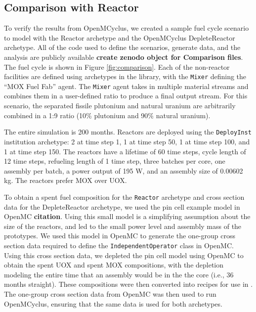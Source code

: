 \subsection{Comparison with \Cycamore Reactor}
To verify the results from OpenMCyclus, we created a sample fuel cycle 
scenario to model with the \Cycamore Reactor archetype and the 
OpenMCyclus DepleteReactor archetype. All of the code used to define the 
scenarios, generate data, and the analysis are publicly available 
\textbf{create zenodo object for Comparison files}. The fuel cycle is 
shown in Figure 
\ref{fig:comparison}. Each of the non-reactor facilities are defined 
using archetypes in the \Cycamore library, with the \Cycamore \texttt{Mixer}
defining the ``MOX Fuel Fab'' agent. The \texttt{Mixer} agent takes in multiple 
material streams and combines them in a user-defined ratio to produce 
a final output stream. For this scenario, the separated fissile plutonium 
and natural uranium are arbitrarily combined in a 1:9 ratio (10\% 
plutonium and 90\% natural uranium). 



The entire simulation is 200 months. Reactors are deployed using the 
\Cycamore \texttt{DeployInst} institution archetype: 2 at time step 1, 
1 at time step 
50, 1 at time step 100, and 1 at time step 150. The reactors have a lifetime 
of 60 time steps, cycle length of 12 time steps, refueling length of 1 
time step, three batches per core, one assembly per batch, a power output of 
195 W, and an assembly size of 0.00602 kg. The reactors prefer MOX over UOX. 
 
To obtain a spent fuel composition for the \Cycamore \texttt{Reactor} 
archetype and cross section data for the DepleteReactor archetype, we 
used the pin cell example model in OpenMC \textbf{citation}. 
Using this 
small model is a simplifying assumption about the size of the reactors, 
and led to the small power level and assembly mass of the prototypes. 
We used this model in OpenMC to generate the one-group cross 
section data required to define the \texttt{IndependentOperator} class 
in OpenMC. Using this cross section data, we depleted the pin cell 
model using OpenMC to obtain the spent UOX and 
spent MOX compositions, with the depletion modeling the entire time that 
an assembly would be in the the core (i.e., 36 months straight). 
These compositions were then converted into recipes for use in 
\Cyclus.
The one-group cross section data from OpenMC was then used to run 
OpenMCyclus, ensuring that the same data is used for both archetypes.  

